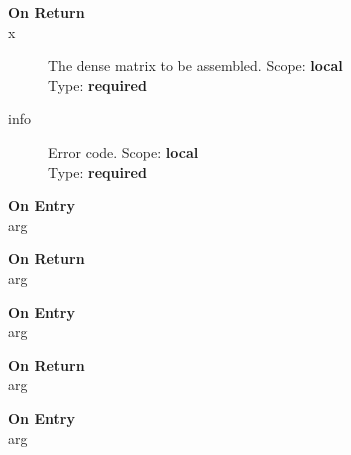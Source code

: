 \begin{description}
\item[\bf On Return]
\item[x] The dense matrix to be assembled.
Scope: {\bf local} \\
Type: {\bf required}\\
\item[info] Error code.
Scope: {\bf local} \\
Type: {\bf required}\\
\end{description}


%
%


\begin{description}
\item[\bf On Entry]
\item[arg]
\end{description}

\begin{description}
\item[\bf On Return]
\item[arg]
\end{description}


%
%


\begin{description}
\item[\bf On Entry]
\item[arg]
\end{description}

\begin{description}
\item[\bf On Return]
\item[arg]
\end{description}


%
%


\begin{description}
\item[\bf On Entry]
\item[arg]
\end{description}

